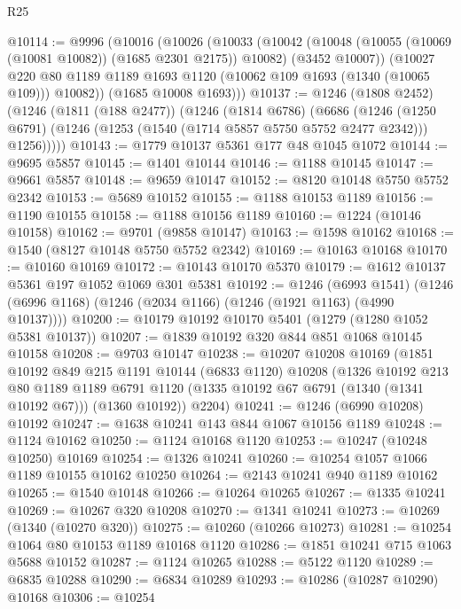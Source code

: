\begin{lexlean}{R25}
\begin{coremodule}
@10114 := @9996
    (@10016
      (@10026
        (@10033
          (@10042
            (@10048 (@10055 (@10069 (@10081 @10082)) (@1685 @2301 @2175)) @10082)
            (@3452 @10007))
          (@10027
            @220
            @80
            @1189
            @1189
            @1693
            @1120
            (@10062 @109 @1693 (@1340 (@10065 @109)))
            @10082))
        (@1685 @10008 @1693)))
@10137 := @1246
    (@1808 @2452)
    (@1246
      (@1811 (@188 @2477))
      (@1246
        (@1814 @6786)
        (@6686
          (@1246
            (@1250 @6791)
            (@1246 (@1253 (@1540 (@1714 @5857 @5750 @5752 @2477 @2342))) @1256)))))
@10143 := @1779 @10137 @5361 @177 @48 @1045 @1072
@10144 := @9695 @5857
@10145 := @1401 @10144
@10146 := @1188 @10145
@10147 := @9661 @5857
@10148 := @9659 @10147
@10152 := @8120 @10148 @5750 @5752 @2342
@10153 := @5689 @10152
@10155 := @1188 @10153 @1189
@10156 := @1190 @10155
@10158 := @1188 @10156 @1189
@10160 := @1224 (@10146 @10158)
@10162 := @9701 (@9858 @10147)
@10163 := @1598 @10162
@10168 := @1540 (@8127 @10148 @5750 @5752 @2342)
@10169 := @10163 @10168
@10170 := @10160 @10169
@10172 := @10143 @10170 @5370
@10179 := @1612 @10137 @5361 @197 @1052 @1069 @301 @5381
@10192 := @1246
    (@6993 @1541)
    (@1246 (@6996 @1168) (@1246 (@2034 @1166) (@1246 (@1921 @1163) (@4990 @10137))))
@10200 := @10179 @10192 @10170 @5401 (@1279 (@1280 @1052 @5381 @10137))
@10207 := @1839 @10192 @320 @844 @851 @1068 @10145 @10158
@10208 := @9703 @10147
@10238 := @10207
    @10208
    @10169
    (@1851
      @10192
      @849
      @215
      @1191
      @10144
      (@6833 @1120)
      @10208
      (@1326
        @10192
        @213
        @80
        @1189
        @1189
        @6791
        @1120
        (@1335 @10192 @67 @6791 (@1340 (@1341 @10192 @67)))
        (@1360 @10192))
      @2204)
@10241 := @1246 (@6990 @10208) @10192
@10247 := @1638 @10241 @143 @844 @1067 @10156 @1189
@10248 := @1124 @10162
@10250 := @1124 @10168 @1120
@10253 := @10247 (@10248 @10250) @10169
@10254 := @1326 @10241
@10260 := @10254 @1057 @1066 @1189 @10155 @10162 @10250
@10264 := @2143 @10241 @940 @1189 @10162
@10265 := @1540 @10148
@10266 := @10264 @10265
@10267 := @1335 @10241
@10269 := @10267 @320 @10208
@10270 := @1341 @10241
@10273 := @10269 (@1340 (@10270 @320))
@10275 := @10260 (@10266 @10273)
@10281 := @10254 @1064 @80 @10153 @1189 @10168 @1120
@10286 := @1851 @10241 @715 @1063 @5688 @10152
@10287 := @1124 @10265
@10288 := @5122 @1120
@10289 := @6835 @10288
@10290 := @6834 @10289
@10293 := @10286 (@10287 @10290) @10168
@10306 := @10254

\end{coremodule}
\end{lexlean}
